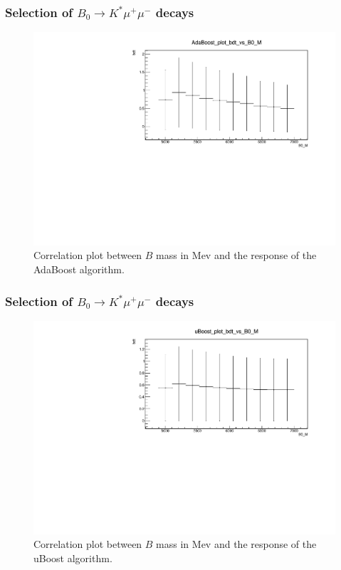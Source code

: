 \documentclass{beamer}
\begin{document}
\begin{frame}
  \frametitle{Selection of $B_0 \rightarrow K^* \mu^+ \mu^-$ decays}

  \begin{figure}
   \includegraphics[width=0.8\linewidth]{figures/cor_AdaBoost}
   \caption{Correlation plot between $B$ mass in Mev and the response of the AdaBoost algorithm.}
  \end{figure}

\end{frame}



\begin{frame}
  \frametitle{Selection of $B_0 \rightarrow K^* \mu^+ \mu^-$ decays}

  \begin{figure}
   \includegraphics[width=0.8\linewidth]{figures/cor_uBoost}
   \caption{Correlation plot between $B$ mass in Mev and the response of the uBoost algorithm.}
  \end{figure}

\end{frame}
\end{document}
